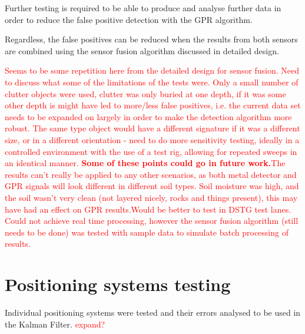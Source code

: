 \documentclass[main.tex]{subfiles}
\begin{document}
Further testing is required to be able to produce and analyse further data in order to reduce the false positive detection with the GPR algorithm. 

Regardless, the false positives can be reduced when the results from both sensors are combined using the sensor fusion algorithm discussed in detailed design.



\textcolor{red}{Seems to be some repetition here from the detailed design for sensor fusion. Need to discuss what some of the limitations of the tests were. Only a small number of clutter objects were used, clutter was only buried at one depth, if it was some other depth is might have led to more/less false positives, i.e. the current data set needs to be expanded on largely in order to make the detection algorithm more robust. The same type object would have a different signature if it was a different size, or in a different orientation - need to do more sensitivity testing, ideally in a controlled environment with the use of a test rig, allowing for repeated sweeps in an identical manner. \textbf{Some of these points could go in future work.}The results can't really be applied to any other scenarios, as both metal detector and GPR signals will look different in different soil types. Soil moisture was high, and the soil wasn't very clean (not layered nicely, rocks and things present), this may have had an effect on GPR results.Would be better to test in DSTG test lanes. Could not achieve real time processing, however the sensor fusion algorithm (still needs to be done) was tested with sample data to simulate batch processing of results.}

\section{Positioning systems testing}
Individual positioning systems were tested and their errors analysed to be used in the Kalman Filter.
\textcolor{red}{expand?}
\end{document}

